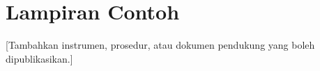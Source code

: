 \chapter{Lampiran Contoh}
[Tambahkan instrumen, prosedur, atau dokumen pendukung yang boleh dipublikasikan.]
